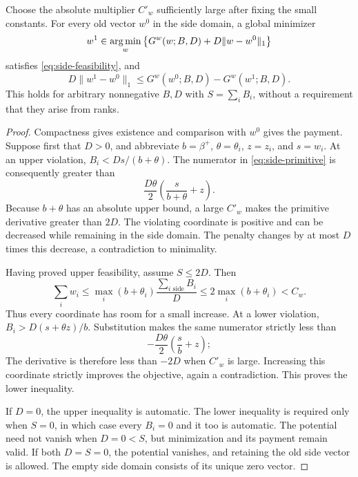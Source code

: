 \begin{lemma}\label{lem:side-tracker}
Choose the absolute multiplier $C'_w$ sufficiently large after
fixing the small constants.  For every old vector $w^0$ in the
side domain, a global minimizer
\begin{equation}\label{eq:side-minimization}
 w^1\in\operatorname*{arg\,min}_w\left\{G^w(w;B,D)+D\|w-w^0\|_1\right\}
\end{equation}
satisfies \eqref{eq:side-feasibility}, and
\begin{equation}\label{eq:side-update-payment}
 D\|w^1-w^0\|_1\le G^w(w^0;B,D)-G^w(w^1;B,D).
\end{equation}
This holds for arbitrary nonnegative $B,D$ with $S=\sum_iB_i$,
without a requirement that they arise from ranks.
\end{lemma}

\begin{proof}
Compactness gives existence and comparison with $w^0$ gives the
payment.  Suppose first that $D>0$, and abbreviate
$b=\beta^+$, $\theta=\theta_i$, $z=z_i$, and $s=w_i$.
At an upper violation, $B_i<Ds/(b+\theta)$.  The numerator in
\eqref{eq:side-primitive} is consequently greater than
\[
 \frac{D\theta}{2}\left(\frac{s}{b+\theta}+z\right).
\]
Because $b+\theta$ has an absolute upper bound, a large $C'_w$
makes the primitive derivative greater than $2D$.
The violating coordinate is positive and can be decreased while
remaining in the side domain.  The penalty changes by at most
$D$ times this decrease, a contradiction to minimality.

Having proved upper feasibility, assume $S\le2D$.  Then
\[
 \sum_iw_i\le \max_i(b+\theta_i)\frac{\sum_{i\text{ side}}B_i}{D}
           \le2\max_i(b+\theta_i)<C_w.
\]
Thus every coordinate has room for a small increase.  At a lower
violation, $B_i>D(s+\theta z)/b$.  Substitution makes the same
numerator strictly less than
\[
 -\frac{D\theta}{2}\left(\frac{s}{b}+z\right);
\]
The derivative is therefore less than $-2D$ when $C'_w$ is large.
Increasing this coordinate strictly improves the objective, again
a contradiction.  This proves the lower inequality.

If $D=0$, the upper inequality is automatic.  The lower inequality
is required only when $S=0$, in which case every $B_i=0$ and it
too is automatic.  The potential need not vanish when $D=0<S$,
but minimization and its payment remain valid.  If both $D=S=0$,
the potential vanishes, and retaining the old side vector is allowed.
The empty side domain consists of its unique zero vector.
\end{proof}

